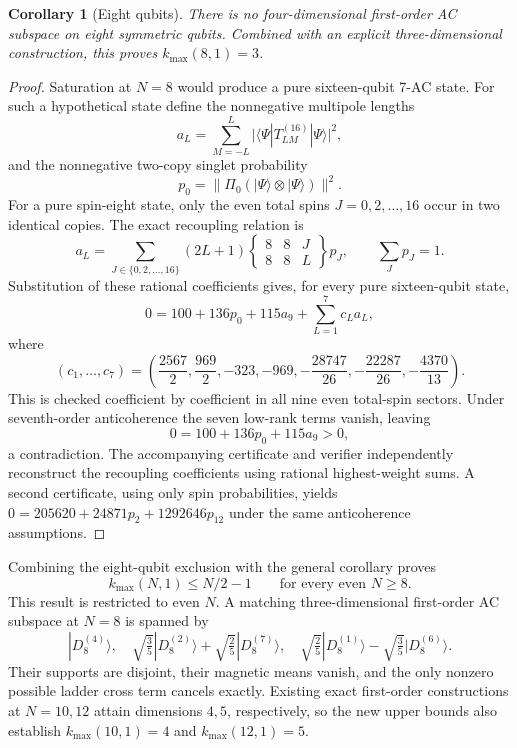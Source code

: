\documentclass[11pt]{article}
\newtheorem{corollary}{Corollary}
\begin{document}
\begin{corollary}[Eight qubits]
There is no four-dimensional first-order AC subspace on eight symmetric qubits. Combined with an explicit three-dimensional construction, this proves $k_{\max}(8,1)=3$.
\end{corollary}
\begin{proof}
Saturation at $N=8$ would produce a pure sixteen-qubit 7-AC state. For such a hypothetical state define the nonnegative multipole lengths
\[
 a_L=\sum_{M=-L}^L\bigl|\langle\Psi|T^{(16)}_{LM}|\Psi\rangle\bigr|^2,
\]
and the nonnegative two-copy singlet probability
\[
 p_0=\|\Pi_0(|\Psi\rangle\otimes|\Psi\rangle)\|^2.
\]
For a pure spin-eight state, only the even total spins $J=0,2,\ldots,16$ occur in two identical copies. The exact recoupling relation is
\[
 a_L=\sum_{J\in\{0,2,\ldots,16\}}(2L+1)
 \begin{Bmatrix}8&8&J\\8&8&L\end{Bmatrix}p_J,
 \qquad \sum_Jp_J=1.
\]
Substitution of these rational coefficients gives, for every pure sixteen-qubit state,
\[
 0=100+136p_0+115a_9+\sum_{L=1}^7c_La_L,
\]
where
\[
 (c_1,\ldots,c_7)=\left(\frac{2567}2,\frac{969}2,-323,-969,-\frac{28747}{26},-\frac{22287}{26},-\frac{4370}{13}\right).
\]
This is checked coefficient by coefficient in all nine even total-spin sectors. Under seventh-order anticoherence the seven low-rank terms vanish, leaving
\[
 0=100+136p_0+115a_9>0,
\]
a contradiction. The accompanying certificate and verifier independently reconstruct the recoupling coefficients using rational highest-weight sums. A second certificate, using only spin probabilities, yields $0=205620+24871p_2+1292646p_{12}$ under the same anticoherence assumptions.
\end{proof}
Combining the eight-qubit exclusion with the general corollary proves
\[
 k_{\max}(N,1)\le N/2-1\qquad\text{for every even }N\ge8.
\]
This result is restricted to even $N$. A matching three-dimensional first-order AC subspace at $N=8$ is spanned by
\[
 |D_8^{(4)}\rangle,\quad
 \sqrt{\tfrac35}|D_8^{(2)}\rangle+\sqrt{\tfrac25}|D_8^{(7)}\rangle,\quad
 \sqrt{\tfrac25}|D_8^{(1)}\rangle-\sqrt{\tfrac35}|D_8^{(6)}\rangle.
\]
Their supports are disjoint, their magnetic means vanish, and the only nonzero possible ladder cross term cancels exactly. Existing exact first-order constructions at $N=10,12$ attain dimensions $4,5$, respectively, so the new upper bounds also establish $k_{\max}(10,1)=4$ and $k_{\max}(12,1)=5$.
\end{document}
